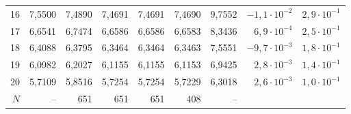 \begin{tabular}{r r rrr r r rr}
16 & 7,5500 & 7,4890 & 7,4691 & 7,4691 & 7,4690 & 9,7552 & $-1{,}1\cdot10^{-2}$ & $2{,}9\cdot10^{-1}$ \\
17 & 6,6541 & 6,7474 & 6,6586 & 6,6586 & 6,6583 & 8,3436 & $6{,}9\cdot10^{-4}$ & $2{,}5\cdot10^{-1}$ \\
18 & 6,4088 & 6,3795 & 6,3464 & 6,3464 & 6,3463 & 7,5551 & $-9{,}7\cdot10^{-3}$ & $1{,}8\cdot10^{-1}$ \\
19 & 6,0982 & 6,2027 & 6,1155 & 6,1155 & 6,1153 & 6,9425 & $2{,}8\cdot10^{-3}$ & $1{,}4\cdot10^{-1}$ \\
20 & 5,7109 & 5,8516 & 5,7254 & 5,7254 & 5,7229 & 6,3018 & $2{,}6\cdot10^{-3}$ & $1{,}0\cdot10^{-1}$ \\
\midrule
$N$ & -- & 651 & 651 & 651 & 408 & -- & & \\
\bottomrule
\end{tabular}

